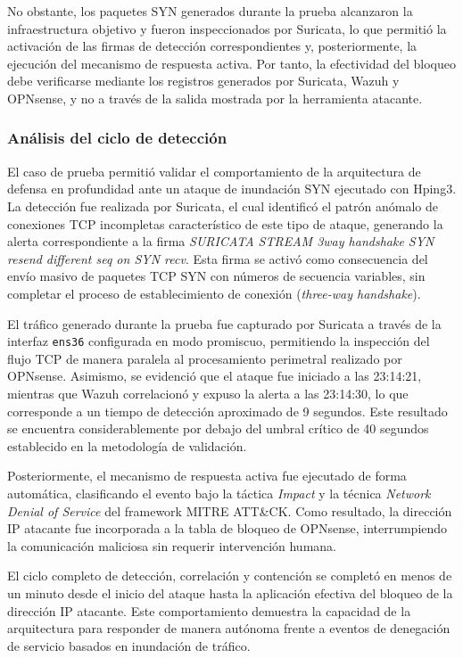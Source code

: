 No obstante, los paquetes SYN generados durante la prueba alcanzaron la infraestructura objetivo y fueron inspeccionados por Suricata, lo 
que permitió la activación de las firmas de detección correspondientes y, posteriormente, la ejecución del mecanismo de respuesta activa. 
Por tanto, la efectividad del bloqueo debe verificarse mediante los registros generados por Suricata, Wazuh y OPNsense, y no a través de 
la salida mostrada por la herramienta atacante.

\subsubsection{Análisis del ciclo de detección}

El caso de prueba permitió validar el comportamiento de la arquitectura de defensa en profundidad ante un ataque de inundación SYN 
ejecutado con Hping3. La detección fue realizada por Suricata, el cual identificó el patrón anómalo de conexiones TCP incompletas 
característico de este tipo de ataque, generando la alerta correspondiente a la firma \textit{SURICATA STREAM 3way handshake SYN resend 
different seq on SYN recv}. Esta firma se activó como consecuencia del envío masivo de paquetes TCP SYN con números de secuencia 
variables, sin completar el proceso de establecimiento de conexión (\textit{three-way handshake}).

El tráfico generado durante la prueba fue capturado por Suricata a través de la interfaz \texttt{ens36} configurada en modo promiscuo, 
permitiendo la inspección del flujo TCP de manera paralela al procesamiento perimetral realizado por OPNsense. Asimismo, se evidenció que 
el ataque fue iniciado a las 23:14:21, mientras que Wazuh correlacionó y expuso la alerta a las 23:14:30, lo que corresponde a un tiempo 
de detección aproximado de 9 segundos. Este resultado se encuentra considerablemente por debajo del umbral crítico de 40 segundos 
establecido en la metodología de validación.

Posteriormente, el mecanismo de respuesta activa fue ejecutado de forma automática, clasificando el evento bajo la táctica \textit{Impact} 
y la técnica \textit{Network Denial of Service} del framework MITRE ATT\&CK. Como resultado, la dirección IP atacante fue incorporada a 
la tabla de bloqueo de OPNsense, interrumpiendo la comunicación maliciosa sin requerir intervención humana.

El ciclo completo de detección, correlación y contención se completó en menos de un minuto desde el inicio del ataque hasta la aplicación 
efectiva del bloqueo de la dirección IP atacante. Este comportamiento demuestra la capacidad de la arquitectura para responder de manera 
autónoma frente a eventos de denegación de servicio basados en inundación de tráfico.

